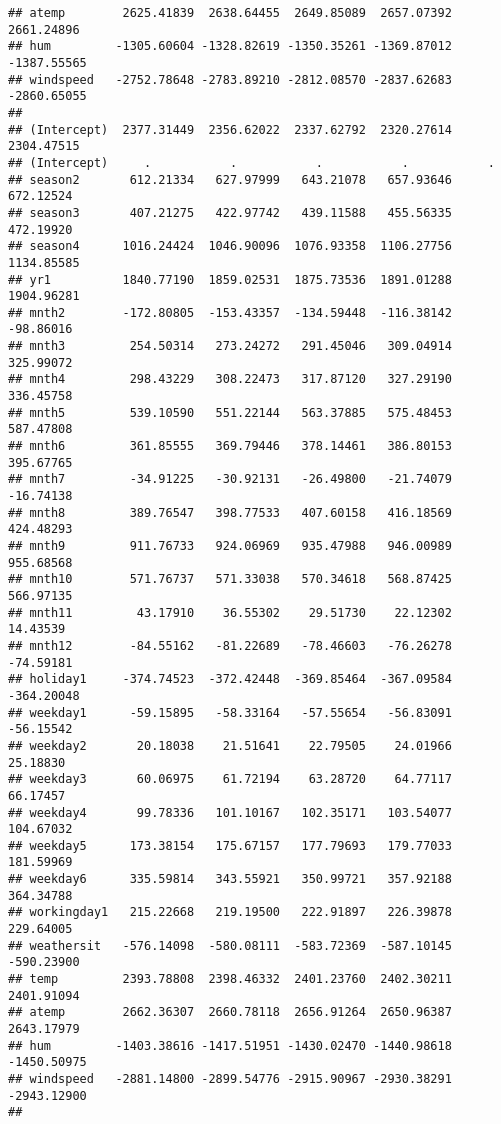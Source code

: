 \documentclass[]{article}
\begin{document}
\begin{verbatim}
## atemp        2625.41839  2638.64455  2649.85089  2657.07392  2661.24896
## hum         -1305.60604 -1328.82619 -1350.35261 -1369.87012 -1387.55565
## windspeed   -2752.78648 -2783.89210 -2812.08570 -2837.62683 -2860.65055
##                                                                        
## (Intercept)  2377.31449  2356.62022  2337.62792  2320.27614  2304.47515
## (Intercept)     .           .           .           .           .      
## season2       612.21334   627.97999   643.21078   657.93646   672.12524
## season3       407.21275   422.97742   439.11588   455.56335   472.19920
## season4      1016.24424  1046.90096  1076.93358  1106.27756  1134.85585
## yr1          1840.77190  1859.02531  1875.73536  1891.01288  1904.96281
## mnth2        -172.80805  -153.43357  -134.59448  -116.38142   -98.86016
## mnth3         254.50314   273.24272   291.45046   309.04914   325.99072
## mnth4         298.43229   308.22473   317.87120   327.29190   336.45758
## mnth5         539.10590   551.22144   563.37885   575.48453   587.47808
## mnth6         361.85555   369.79446   378.14461   386.80153   395.67765
## mnth7         -34.91225   -30.92131   -26.49800   -21.74079   -16.74138
## mnth8         389.76547   398.77533   407.60158   416.18569   424.48293
## mnth9         911.76733   924.06969   935.47988   946.00989   955.68568
## mnth10        571.76737   571.33038   570.34618   568.87425   566.97135
## mnth11         43.17910    36.55302    29.51730    22.12302    14.43539
## mnth12        -84.55162   -81.22689   -78.46603   -76.26278   -74.59181
## holiday1     -374.74523  -372.42448  -369.85464  -367.09584  -364.20048
## weekday1      -59.15895   -58.33164   -57.55654   -56.83091   -56.15542
## weekday2       20.18038    21.51641    22.79505    24.01966    25.18830
## weekday3       60.06975    61.72194    63.28720    64.77117    66.17457
## weekday4       99.78336   101.10167   102.35171   103.54077   104.67032
## weekday5      173.38154   175.67157   177.79693   179.77033   181.59969
## weekday6      335.59814   343.55921   350.99721   357.92188   364.34788
## workingday1   215.22668   219.19500   222.91897   226.39878   229.64005
## weathersit   -576.14098  -580.08111  -583.72369  -587.10145  -590.23900
## temp         2393.78808  2398.46332  2401.23760  2402.30211  2401.91094
## atemp        2662.36307  2660.78118  2656.91264  2650.96387  2643.17979
## hum         -1403.38616 -1417.51951 -1430.02470 -1440.98618 -1450.50975
## windspeed   -2881.14800 -2899.54776 -2915.90967 -2930.38291 -2943.12900
##                                                                

\end{verbatim}
\end{document}
